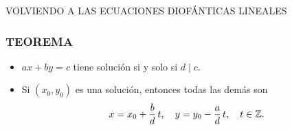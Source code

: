 




\begin{frame}
  \vfill

  \begin{center}\huge\headingfont
    VOLVIENDO A LAS ECUACIONES DIOFÁNTICAS LINEALES
  \end{center}

  \vfill
\end{frame}

\begin{frame}
  \frametitle{TEOREMA}


  \begin{itemize}
  \item<3-> $ax + by = c$ tiene solución si y solo si $d \mid c$.



  \item<6-> Si $(x_0,y_0)$ es una solución, entonces todas las demás son
    \[
      x = x_0 + \frac{b}{d}\,t,
      \quad
      y = y_0 - \frac{a}{d}\,t,
      \quad
      t \in \mathbb{Z}.
    \]
  \end{itemize}
\end{frame}

